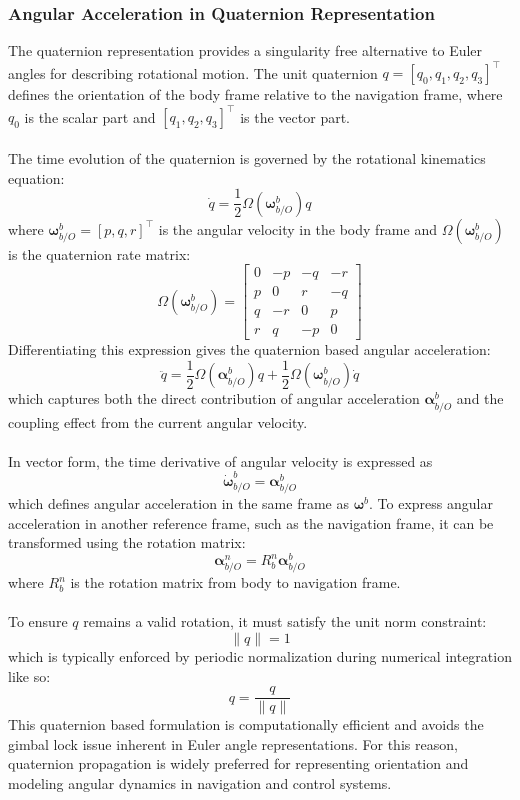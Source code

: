 \subsubsection{Angular Acceleration in Quaternion Representation}
The quaternion representation provides a singularity free alternative to Euler angles for describing rotational motion. The unit quaternion $q = [q_0, q_1, q_2, q_3]^\top$ defines the orientation of the body frame relative to the navigation frame, where $q_0$ is the scalar part and $[q_1, q_2, q_3]^\top$ is the vector part.  
\\ \\
The time evolution of the quaternion is governed by the rotational kinematics equation:
$$
    \dot{q} = \frac{1}{2}\Omega(\boldsymbol{\omega}_{b/O}^{b})q
$$
where $\boldsymbol{\omega}_{b/O}^{b} = [p, q, r]^\top$ is the angular velocity in the body frame and $\Omega(\boldsymbol{\omega}_{b/O}^{b})$ is the quaternion rate matrix:
$$
    \Omega(\boldsymbol{\omega}_{b/O}^{b}) =
    \begin{bmatrix}
        0 & -p & -q & -r \\
        p &  0 &  r & -q \\
        q & -r &  0 &  p \\
        r &  q & -p &  0
    \end{bmatrix}
$$
Differentiating this expression gives the quaternion based angular acceleration:
$$
    \ddot{q} = \frac{1}{2}\Omega(\boldsymbol{\alpha}_{b/O}^{b})q + \frac{1}{2}\Omega(\boldsymbol{\omega}_{b/O}^{b})\dot{q}
$$
which captures both the direct contribution of angular acceleration $\boldsymbol{\alpha}_{b/O}^{b}$ and the coupling effect from the current angular velocity.  
\\ \\
In vector form, the time derivative of angular velocity is expressed as
$$
    \dot{\boldsymbol{\omega}}_{b/O}^{b} = \boldsymbol{\alpha}_{b/O}^{b}
$$
which defines angular acceleration in the same frame as $\boldsymbol{\omega}^b$. To express angular acceleration in another reference frame, such as the navigation frame, it can be transformed using the rotation matrix:
$$
    \boldsymbol{\alpha}_{b/O}^{n} = R_b^n \boldsymbol{\alpha}_{b/O}^{b}
$$
where $R_b^n$ is the rotation matrix from body to navigation frame.
\\ \\
To ensure $q$ remains a valid rotation, it must satisfy the unit norm constraint:
$$
    \|q\| = 1
$$
which is typically enforced by periodic normalization during numerical integration like so:
$$
    q = \frac{q}{\|q\|}
$$  
This quaternion based formulation is computationally efficient and avoids the gimbal lock issue inherent in Euler angle representations. For this reason, quaternion propagation is widely preferred for representing orientation and modeling angular dynamics in navigation and control systems.



